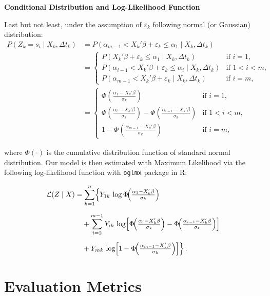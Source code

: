 {\noindent\bfseries Conditional Distribution and Log-Likelihood Function}

Last but not least, under the assumption of \(\varepsilon_k \) following normal (or Gaussian) distribution:
\begin{align}
P(Z_k = s_i \mid X_k, \Delta t_k) &= P(\alpha_{m-1} < X_k'\beta+ \varepsilon_k \leq \alpha_1 \mid X_k, \Delta t_k) \\
&=
\begin{cases}
P(X_k' \beta + \varepsilon_k \leq \alpha_1 \mid X_k, \Delta t_k) & \text{if } i = 1, \\
P(\alpha_{i-1} < X_k' \beta + \varepsilon_k \leq \alpha_i \mid X_k, \Delta t_k) & \text{if } 1<i<m, \\
P(\alpha_{m-1} < X_k' \beta + \varepsilon_k \mid X_k, \Delta t_k) & \text{if } i = m,
\end{cases} \\
&=
\begin{cases}
\Phi\left( \frac{\alpha_1 - X_k' \beta}{\sigma_k} \right) & \text{if } i = 1, \\
\Phi\left( \frac{\alpha_i - X_k' \beta}{\sigma_k} \right) - \Phi\left( \frac{\alpha_{i-1} - X_k' \beta}{\sigma_k} \right) & \text{if } 1<i<m, \\
1 - \Phi\left( \frac{\alpha_{m-1} - X_k' \beta}{\sigma_k} \right) & \text{if } i=m,
\end{cases}
\label{eq:8}
\end{align}

where \(\Phi(\cdot)\) is the cumulative distribution function of standard normal distribution. Our model is then estimated with Maximum Likelihood via the following log-likelihood function with \verb|oglmx| package in R:

\begin{equation}
\label{eq:9}
\begin{split}
\mathcal{L}(Z \mid X)
&= \sum_{k=1}^n \Bigl\{
     Y_{1k}\,\log\Phi\!\Bigl(\tfrac{\alpha_1 - X_k'\beta}{\sigma_k}\Bigr) \\[6pt]
&\quad
   + \sum_{i=2}^{m-1} Y_{ik}\,\log\Bigl[
       \Phi\!\Bigl(\tfrac{\alpha_i - X_k'\beta}{\sigma_k}\Bigr)
     - \Phi\!\Bigl(\tfrac{\alpha_{i-1} - X_k'\beta}{\sigma_k}\Bigr)
     \Bigr] \\[6pt]
&\quad
   + Y_{mk}\,\log\Bigl[
       1 - \Phi\!\Bigl(\tfrac{\alpha_{m-1} - X_k'\beta}{\sigma_k}\Bigr)
     \Bigr]
 \Bigr\}\,.
\end{split}
\end{equation}





\section{Evaluation Metrics}